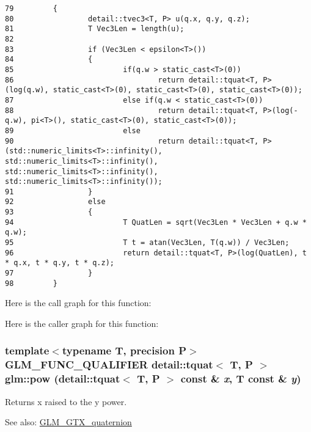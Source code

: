 \begin{Code}\begin{verbatim}79         {
80                 detail::tvec3<T, P> u(q.x, q.y, q.z);
81                 T Vec3Len = length(u);
82 
83                 if (Vec3Len < epsilon<T>())
84                 {
85                         if(q.w > static_cast<T>(0))
86                                 return detail::tquat<T, P>(log(q.w), static_cast<T>(0), static_cast<T>(0), static_cast<T>(0));
87                         else if(q.w < static_cast<T>(0))
88                                 return detail::tquat<T, P>(log(-q.w), pi<T>(), static_cast<T>(0), static_cast<T>(0));
89                         else
90                                 return detail::tquat<T, P>(std::numeric_limits<T>::infinity(), std::numeric_limits<T>::infinity(), std::numeric_limits<T>::infinity(), std::numeric_limits<T>::infinity());
91                 }
92                 else
93                 {
94                         T QuatLen = sqrt(Vec3Len * Vec3Len + q.w * q.w);
95                         T t = atan(Vec3Len, T(q.w)) / Vec3Len;
96                         return detail::tquat<T, P>(log(QuatLen), t * q.x, t * q.y, t * q.z);
97                 }
98         }
\end{verbatim}
\end{Code}




Here is the call graph for this function:

Here is the caller graph for this function:\hypertarget{group__gtx__quaternion_g49e7cd8958d474290778760d171a44d2}{
\subsubsection[pow]{\setlength{\rightskip}{0pt plus 5cm}template$<$typename T, precision P$>$ GLM\_\-FUNC\_\-QUALIFIER detail::tquat$<$ T, P $>$ glm::pow (detail::tquat$<$ T, P $>$ const \& {\em x}, \/  T const \& {\em y})}}
\label{group__gtx__quaternion_g49e7cd8958d474290778760d171a44d2}


Returns x raised to the y power.

\begin{Desc}
\item[See also:]\hyperlink{group__gtx__quaternion}{GLM\_\-GTX\_\-quaternion} \end{Desc}


